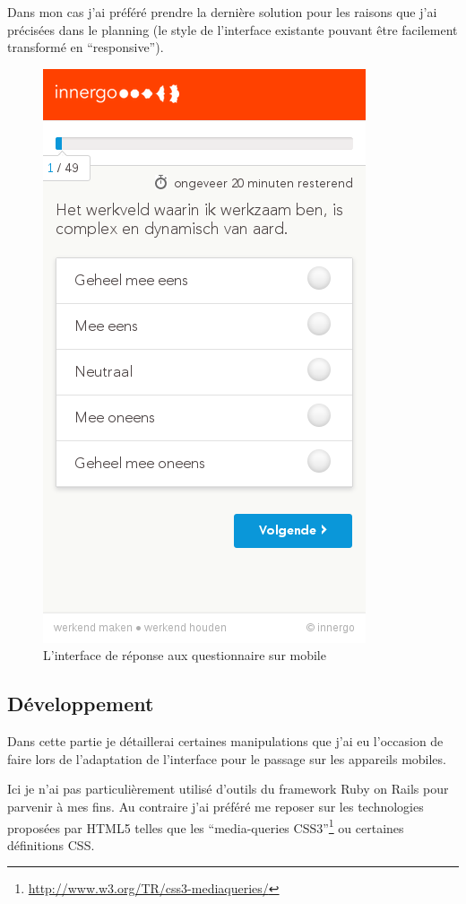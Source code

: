 \documentclass[12pt,a4paper]{book}
\begin{document}
Dans mon cas j'ai préféré prendre la dernière solution pour les raisons que j'ai précisées dans le planning (le style de l'interface existante pouvant être facilement transformé en ``responsive'').

\begin{figure}[htp]
\centering
\includegraphics[scale=0.5]{img/calibris3.png}
 \caption{L'interface de réponse aux questionnaire sur mobile}
 \label{fig.calibris3}
\end{figure}

\subsection{Développement}

Dans cette partie je détaillerai certaines manipulations que j'ai eu l'occasion de faire lors de l'adaptation de l'interface pour le passage sur les appareils mobiles.

Ici je n'ai pas particulièrement utilisé d'outils du framework Ruby on Rails pour parvenir à mes fins. Au contraire j'ai préféré me reposer sur les technologies proposées par HTML5 telles que les ``media-queries CSS3''\footnote{\url{http://www.w3.org/TR/css3-mediaqueries/}} ou certaines définitions CSS.
\end{document}
